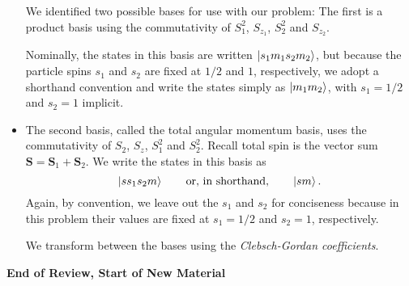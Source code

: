 \documentclass[11pt, a4paper]{article}
\newcommand{\eqtext}[1]{\qquad \text{#1} \qquad}
\renewcommand{\vec}[1]{\bm{#1}} %
\begin{document}
\begin{itemize}
	We identified two possible bases for use with our problem: The first is a product basis using the commutativity of $ S_{1}^{2} $, $ S_{z_{1}} $, $ S_{2}^{2} $ and $ S_{z_{2}} $. 
	
	Nominally, the states in this basis are written $ \ket{s_{1}m_{1}s_{2}m_{2}} $, but because the particle spins $ s_{1} $ and $ s_{2} $ are fixed at $ 1/2 $ and $ 1 $, respectively, we adopt a shorthand convention and write the states simply as $ \ket{m_{1}m_{2}} $, with $ s_{1} = 1/2 $ and $ s_{2} = 1 $ implicit.
	
	\item The second basis, called the total angular momentum basis, uses the commutativity of $ S_{2} $, $ S_{z} $, $ S_{1}^{2} $ and $ S_{2}^{2} $. Recall total spin is the vector sum $ \vec{S} = \vec{S}_{1} + \vec{S}_{2} $.  We write the states in this basis as
	\begin{equation*}
		\ket{ss_{1}s_{2}m} \eqtext{or, in shorthand,} \ket{sm}.
	\end{equation*}
	Again, by convention, we leave out the $ s_{1} $ and $ s_{2} $ for conciseness because in this problem their values are fixed at $ s_{1} = 1/2 $ and $ s_{2} = 1 $, respectively.
	
	We transform between the bases using the \textit{Clebsch-Gordan coefficients}.
\end{itemize}
\textbf{End of Review, Start of New Material}
\end{document}
